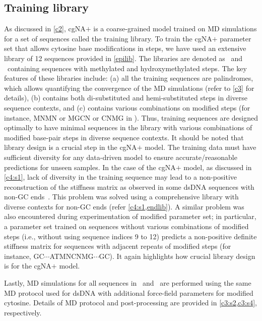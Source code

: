 \subsection{Training library}
As discussed in \cref{c2}, cgNA$+$ is a coarse-grained model trained on MD simulations for a set of sequences called the training library.
To train the cgNA$+$ parameter set that allows cytosine base modifications in \cpg steps, we have used an extensive library of 12 sequences provided in \cref{epilib}.
The libraries are denoted as \Lbm \ and \Lbh \ containing sequences with methylated and hydroxymethylated \cpg steps.
The key features of these libraries include: (a) all the training sequences are palindromes, which allows quantifying the convergence of the MD simulations (refer to \cref{c3} for details), (b) contains both di-substituted and hemi-substituted \cpg steps in diverse sequence contexts, and (c) contains various combinations on modified \cpg steps (for instance, MNMN or MGCN or CNMG in \Lbm).
Thus, training sequences are designed optimally to have minimal sequences in the library with various combinations of modified base-pair steps in diverse sequence contexts.
It should be noted that library design is a crucial step in the cgNA$+$ model.
The training data must have sufficient diversity for any data-driven model to ensure accurate/reasonable predictions for unseen samples.
In the case of the cgNA$+$ model, as discussed in \cref{c4:s1}, lack of diversity in the training sequence may lead to a non-positive reconstruction of the stiffness matrix as observed in some dsDNA sequences with non-GC ends~\cite{patelithesis}. 
This problem was solved using a comprehensive library with diverse contexts for non-GC ends (refer \cref{c4:s1,endlib}).
A similar problem was also encountered during experimentation of modified parameter set; in particular, a parameter set trained on sequences without various combinations of modified \cpg steps (i.e., without using sequence indices 9 to 12) predicts a non-positive definite stiffness matrix for sequences with adjacent repeats of modified \cpg steps (for instance, GC$\cdots$ATMNCNMG$\cdots$GC).
It again highlights how crucial library design is for the cgNA$+$ model.

Lastly, MD simulations for all sequences in \Lbm \ and \Lbh \ are performed using the same MD protocol used for dsDNA with additional force-field parameters for modified cytosine. 
Details of MD protocol and post-processing are provided in \cref{c3:s2,c3:s4}, respectively.

